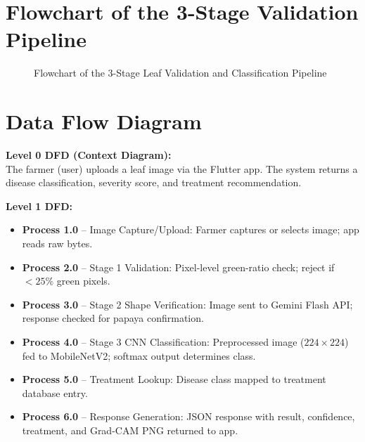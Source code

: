 \documentclass[12pt,a4paper]{report}
\begin{document}
\section{Flowchart of the 3-Stage Validation Pipeline}

\begin{figure}[h!]
\centering
\caption{Flowchart of the 3-Stage Leaf Validation and Classification Pipeline}
\label{fig:flowchart}
\end{figure}

\section{Data Flow Diagram}

\textbf{Level 0 DFD (Context Diagram):}\\
The farmer (user) uploads a leaf image via the Flutter app. The system returns a disease classification, severity score, and treatment recommendation.

\textbf{Level 1 DFD:}
\begin{itemize}
    \item \textbf{Process 1.0} -- Image Capture/Upload: Farmer captures or selects image; app reads raw bytes.
    \item \textbf{Process 2.0} -- Stage 1 Validation: Pixel-level green-ratio check; reject if $<25\%$ green pixels.
    \item \textbf{Process 3.0} -- Stage 2 Shape Verification: Image sent to Gemini Flash API; response checked for papaya confirmation.
    \item \textbf{Process 4.0} -- Stage 3 CNN Classification: Preprocessed image ($224 \times 224$) fed to MobileNetV2; softmax output determines class.
    \item \textbf{Process 5.0} -- Treatment Lookup: Disease class mapped to treatment database entry.
    \item \textbf{Process 6.0} -- Response Generation: JSON response with result, confidence, treatment, and Grad-CAM PNG returned to app.
\end{itemize}
\end{document}
